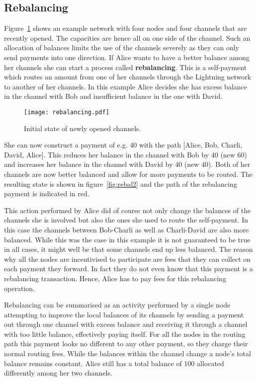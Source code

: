 \documentclass[final]{fhnwreport}       %
\begin{document}
\subsection{Rebalancing}
Figure~\ref{fig:rebal} shows an example network with four nodes and four channels that are recently opened. The capacities are hence all on one side of the channel. Such an allocation of balances limits the use of the channels severely as they can only send payments into one direction. If Alice wants to have a better balance among her channels she can start a process called \textbf{rebalancing}. This is a self-payment which routes an amount from one of her channels through the Lightning network to another of her channels. In this example Alice decides she has excess balance in the channel with Bob and insufficient balance in the one with David.

\begin{figure}[H]
\centering
\texttt{[image: rebalancing.pdf]}
\caption{Initial state of newly opened channels.}
\label{fig:rebal}
\end{figure}

She can now construct a payment of e.g. 40 with the path [Alice, Bob, Charli, David, Alice]. This reduces her balance in the channel with Bob by 40 (new 60) and increases her balance in the channel with David by 40 (new 40). Both of her channels are now better balanced and allow for more payments to be routed. The resulting state is shown in figure~\ref{fig:rebal2} and the path of the rebalancing payment is indicated in red. 

This action performed by Alice did of course not only change the balances of the channels she is involved but also the ones she used to route the self-payment. In this case the channels between Bob-Charli as well as Charli-David are also more balanced. While this was the case in this example it is not guaranteed to be true in all cases, it might well be that some channels end up less balanced. The reason why all the nodes are incentivised to participate are fees that they can collect on each payment they forward. In fact they do not even know that this payment is a rebalancing transaction. Hence, Alice has to pay fees for this rebalancing operation. 

Rebalancing can be summarised as an activity performed by a single node attempting to improve the local balances of its channels by sending a payment out through one channel with excess balance and receiving it through a channel with too little balance, effectively paying itself. For all the nodes in the routing path this payment looks no different to any other payment, so they charge their normal routing fees. While the balances within the channel change a node's total balance remains constant. Alice still has a total balance of 100 allocated differently among her two channels. 
\end{document}
